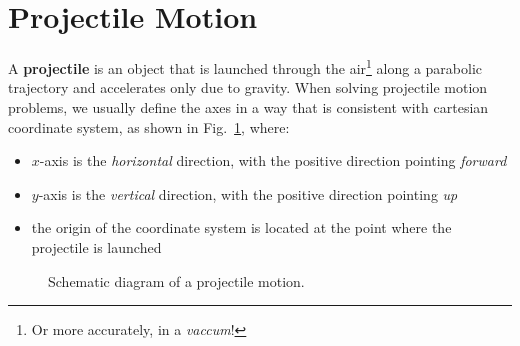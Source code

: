 %
%
%
%
%
%
%
%
%
%

\section{Projectile Motion}

A \textbf{projectile} is an object that is launched through the air\footnote{Or
  more accurately, in a \emph{vaccum}!} along a parabolic trajectory and
accelerates only due to gravity. When solving projectile motion problems, we
usually define the axes in a way that is consistent with cartesian coordinate
system, as shown in Fig.~\ref{fig:projectile}, where:
\begin{itemize}[nosep]
\item $x$-axis is the \emph{horizontal} direction, with the positive direction
  pointing \emph{forward}
\item $y$-axis is the \emph{vertical} direction, with the positive direction
  pointing \emph{up}
\item the origin of the coordinate system is located at the point where the
  projectile is launched
\end{itemize}

\begin{figure}[ht]
  \centering
  \caption{Schematic diagram of a projectile motion.}
  \label{fig:projectile}
\end{figure}

